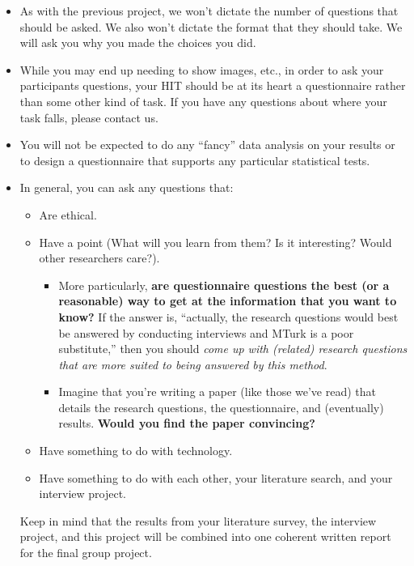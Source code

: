 \documentclass{article}
\begin{document}
\begin{itemize}
    \item As with the previous project, we won't dictate the number of questions that should be asked. We also won't dictate the format that they should take. We will ask you why you made the choices you did.
    
    \item While you may end up needing to show images, etc., in order to ask your participants questions, your HIT should be at its heart a questionnaire rather than some other kind of task. If you have any questions about where your task falls, please contact us.
    
    \item You will not be expected to do any ``fancy'' data analysis on your results or to design a questionnaire that supports any particular statistical tests.
    
    \item In general, you can ask any questions that:
    \begin{itemize}
        \item Are ethical.
        \item Have a point (What will you learn from them? Is it interesting? Would other researchers care?).
        \begin{itemize}
            \item More particularly, \textbf{are questionnaire questions the best (or a reasonable) way to get at the information that you want to know?} If the answer is, ``actually, the research questions would best be answered by conducting interviews and MTurk is a poor substitute,'' then you should \textit{come up with (related) research questions that are more suited to being answered by this method}.
            \item Imagine that you're writing a paper (like those we've read) that details the research questions, the questionnaire, and (eventually) results. \textbf{Would you find the paper convincing?}
        \end{itemize}
        \item Have something to do with technology.
        \item Have something to do with each other, your literature search, and your interview project.
    \end{itemize}
    Keep in mind that the results from your literature survey, the interview project, and this project will be combined into one coherent written report for the final group project.
\end{itemize}
\end{document}
